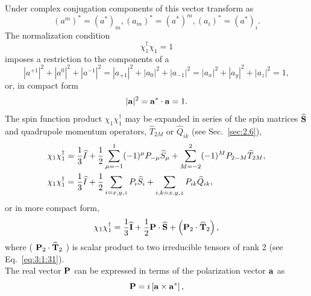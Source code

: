 Under complex conjugation components of this vector transform as
\begin{equation}
\left(a^{m}\right)^{*}=\left(a^{*}\right)_{m},\left(a_{m}\right)^{*}=\left(a^{*}\right)^{m},\left(a_{i}\right)^{*}=\left(a^{*}\right)_{i} . \label{eq:6:3:67}
\end{equation}
The normalization condition
\begin{equation}
\chi_{1}^{\dagger} \chi_{1}=1 \label{eq:6:3:68}
\end{equation}
imposes a restriction to the components of a
\begin{equation}
\left|a^{+1}\right|^{2}+\left|a^{0}\right|^{2}+\left|a^{-1}\right|^{2}=\left|a_{+1}\right|^{2}+\left|a_{0}\right|^{2}+\left|a_{-1}\right|^{2}=\left|a_{x}\right|^{2}+\left|a_{y}\right|^{2}+\left|a_{z}\right|^{2}=1, \label{eq:6:3:69}
\end{equation}
or, in compact form
\begin{equation}
|\mathbf{a}|^{2}=\mathbf{a}^{*} \cdot \mathbf{a}=1 . \label{eq:6:3:70}
\end{equation}
The spin function product $\chi_{1} \chi_{1}^{\dagger}$ may be expanded in series of the spin matrices $\widehat{\mathbf{S}}$ and quadrupole momentum operators, $\widehat{T}_{2 M}$ or $\widehat{Q}_{i k}$ (see Sec.~\ref{sec:2.6}),
\begin{align}
& \chi_{1} \chi_{1}^{\dagger}=\frac{1}{3} \widehat{I}+\frac{1}{2} \sum_{\mu=-1}^{1}(-1)^{\mu} P_{-\mu} \widehat{S}_{\mu}+\sum_{M=-2}^{2}(-1)^{M} P_{2-M} \widehat{T}_{2 M}, \notag\\
& \chi_{1} \chi_{1}^{\dagger}=\frac{1}{3} \widehat{I}+\frac{1}{2} \sum_{i=x, y, z} P_{i} \widehat{S}_{i}+\sum_{i, k=x, y, z} P_{i k} \widehat{Q}_{i k}, \label{eq:6:3:71}
\end{align}
or in more compact form,
\begin{equation}
\chi_{1} \chi_{1}^{\dagger}=\frac{1}{3} \widehat{\mathbf{I}}+\frac{1}{2} \mathbf{P} \cdot \widehat{\mathbf{S}}+\left(\mathbf{P}_{2} \cdot \widehat{\mathbf{T}}_{2}\right), \label{eq:6:3:72}
\end{equation}
where ( $\mathbf{P}_{2} \cdot \widehat{\mathbf{T}}_{2}$ ) is scalar product to two irreducible tensors of rank 2 (see Eq.~\eqref{eq:3:1:31}).\\
The real vector $\mathbf{P}$ can be expressed in terms of the polarization vector $\mathbf{a}$ as
\begin{equation}
\mathbf{P}=i\left[\mathbf{a} \times \mathbf{a}^{*}\right], \label{eq:6:3:73}
\end{equation}
